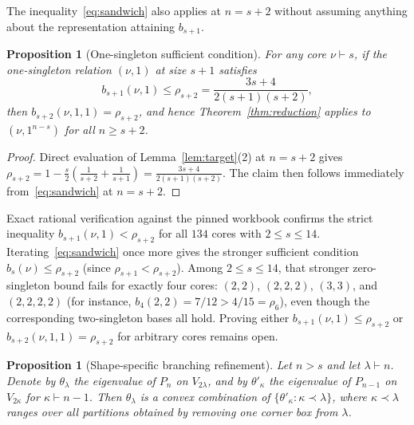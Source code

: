 \documentclass[11pt]{article}
\newtheorem{proposition}[theorem]{Proposition}
\theoremstyle{remark}
\begin{document}
The inequality~\eqref{eq:sandwich} also applies at $n = s + 2$ without assuming
anything about the representation attaining $b_{s+1}$.

\begin{proposition}[One-singleton sufficient condition]\label{prop:sufficient}
For any core $\nu \vdash s$, if the one-singleton relation $(\nu, 1)$ at size
$s + 1$ satisfies
\[
  b_{s+1}(\nu, 1) \le \rho_{s+2} = \frac{3s + 4}{2(s+1)(s+2)},
\]
then $b_{s+2}(\nu, 1, 1) = \rho_{s+2}$, and hence Theorem~\ref{thm:reduction}
applies to $(\nu, 1^{n-s})$ for all $n \ge s+2$.
\end{proposition}

\begin{proof}
Direct evaluation of Lemma~\ref{lem:target}(2) at $n = s+2$ gives
$\rho_{s+2} = 1 - \frac{s}{2}(\frac{1}{s+2} + \frac{1}{s+1}) = \frac{3s+4}{2(s+1)(s+2)}$.
The claim then follows immediately from~\eqref{eq:sandwich} at $n = s+2$.
\end{proof}

Exact rational verification against the pinned workbook confirms the strict
inequality $b_{s+1}(\nu, 1) < \rho_{s+2}$ for all $134$ cores with
$2 \le s \le 14$. Iterating~\eqref{eq:sandwich} once more gives the stronger
sufficient condition $b_s(\nu) \le \rho_{s+2}$ (since $\rho_{s+1} < \rho_{s+2}$).
Among $2 \le s \le 14$, that stronger zero-singleton bound fails for exactly
four cores: $(2,2)$, $(2,2,2)$, $(3,3)$, and $(2,2,2,2)$ (for instance,
$b_4(2,2) = 7/12 > 4/15 = \rho_6$), even though the corresponding two-singleton
bases all hold. Proving either $b_{s+1}(\nu, 1) \le \rho_{s+2}$ or
$b_{s+2}(\nu, 1, 1) = \rho_{s+2}$ for arbitrary cores remains open.

\begin{proposition}[Shape-specific branching refinement]\label{prop:branching}
Let $n > s$ and let $\lambda \vdash n$. Denote by $\theta_\lambda$ the
eigenvalue of $P_n$ on $V_{2\lambda}$, and by $\theta'_\kappa$ the eigenvalue
of $P_{n-1}$ on $V_{2\kappa}$ for $\kappa \vdash n-1$. Then $\theta_\lambda$ is
a convex combination of $\{\theta'_\kappa : \kappa \prec \lambda\}$, where
$\kappa \prec \lambda$ ranges over all partitions obtained by removing one
corner box from $\lambda$.
\end{proposition}
\end{document}
